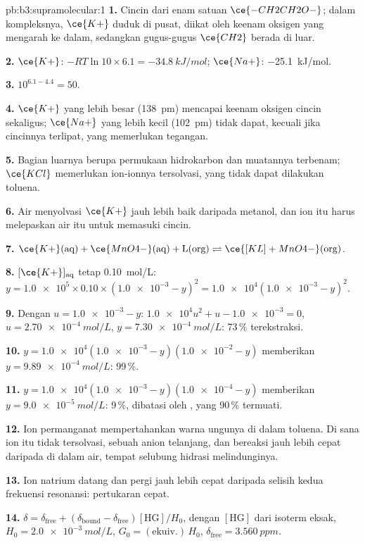 \begin{solution}{pb:b3:supramolecular:1}
\textbf{1.} Cincin dari enam satuan $\ce{-CH2CH2O-}$; dalam kompleksnya, $\ce{K+}$ duduk di pusat, diikat oleh
keenam oksigen yang mengarah ke dalam, sedangkan gugus-gugus $\ce{CH2}$ berada di luar.

\textbf{2.} $\ce{K+}$: $-RT\ln 10 \times 6.1 = \qty{-34.8}{kJ/mol}$; $\ce{Na+}$: \qty{-25.1}{kJ/mol}.

\textbf{3.} $10^{6.1 - 4.4} = 50$.

\textbf{4.} $\ce{K+}$ yang lebih besar (\qty{138}{pm}) mencapai keenam oksigen cincin sekaligus;
$\ce{Na+}$ yang lebih kecil (\qty{102}{pm}) tidak dapat, kecuali jika cincinnya terlipat, yang memerlukan tegangan.

\textbf{5.} Bagian luarnya berupa permukaan hidrokarbon dan muatannya terbenam; $\ce{KCl}$
memerlukan ion-ionnya tersolvasi, yang tidak dapat dilakukan toluena.

\textbf{6.} Air menyolvasi $\ce{K+}$ jauh lebih baik daripada metanol, dan ion itu harus melepaskan
air itu untuk memasuki cincin.

\textbf{7.} $\ce{K+}(\text{aq}) + \ce{MnO4-}(\text{aq}) + \mathrm L(\text{org}) \rightleftharpoons \ce{[KL]+MnO4-}(\text{org})$.

\textbf{8.} $[\ce{K+}]_{\mathrm{aq}}$ tetap \qty{0.10}{mol/L}: $y = \num{1.0e5} \times 0.10 \times (\num{1.0e-3} - y)^2 = \num{1.0e4}(\num{1.0e-3} - y)^2$.

\textbf{9.} Dengan $u = \num{1.0e-3} - y$: $\num{1.0e4}u^2 + u - \num{1.0e-3} = 0$, $u = \qty{2.70e-4}{mol/L}$, $y = \qty{7.30e-4}{mol/L}$: 73\,\%
terekstraksi.

\textbf{10.} $y = \num{1.0e4}(\num{1.0e-3} - y)(\num{1.0e-2} - y)$ memberikan $y = \qty{9.89e-4}{mol/L}$: 99\,\%.

\textbf{11.} $y = \num{1.0e4}(\num{1.0e-3} - y)(\num{1.0e-4} - y)$ memberikan $y = \qty{9.0e-5}{mol/L}$: 9\,\%, dibatasi oleh ,
yang 90\,\% termuati.

\textbf{12.} Ion permanganat mempertahankan warna ungunya di dalam toluena. Di sana
ion itu tidak tersolvasi, sebuah anion telanjang, dan bereaksi jauh lebih cepat daripada di dalam air, tempat
selubung hidrasi melindunginya.

\textbf{13.} Ion natrium datang dan pergi jauh lebih cepat daripada selisih
kedua frekuensi resonansi: pertukaran cepat.

\textbf{14.} $\delta = \delta_{\mathrm{free}} + (\delta_{\mathrm{bound}} - \delta_{\mathrm{free}})[\mathrm{HG}]/H_0$, dengan $[\mathrm{HG}]$ dari isoterm eksak, $H_0 = \qty{2.0e-3}{mol/L}$,
$G_0 = (\text{ekuiv.})\,H_0$, $\delta_{\mathrm{free}} = \qty{3.560}{ppm}$.


\end{solution}
